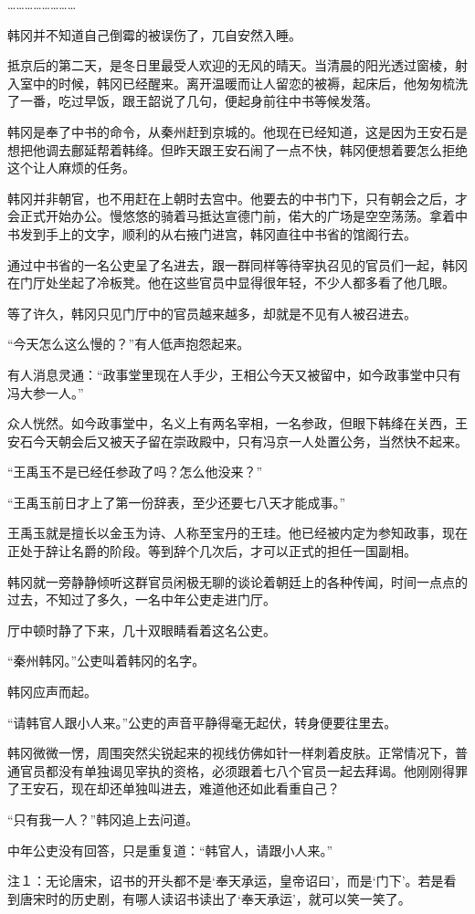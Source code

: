 ……………………

韩冈并不知道自己倒霉的被误伤了，兀自安然入睡。

抵京后的第二天，是冬日里最受人欢迎的无风的晴天。当清晨的阳光透过窗棱，射入室中的时候，韩冈已经醒来。离开温暖而让人留恋的被褥，起床后，他匆匆梳洗了一番，吃过早饭，跟王韶说了几句，便起身前往中书等候发落。

韩冈是奉了中书的命令，从秦州赶到京城的。他现在已经知道，这是因为王安石是想把他调去鄜延帮着韩绛。但昨天跟王安石闹了一点不快，韩冈便想着要怎么拒绝这个让人麻烦的任务。

韩冈并非朝官，也不用赶在上朝时去宫中。他要去的中书门下，只有朝会之后，才会正式开始办公。慢悠悠的骑着马抵达宣德门前，偌大的广场是空空荡荡。拿着中书发到手上的文字，顺利的从右掖门进宫，韩冈直往中书省的馆阁行去。

通过中书省的一名公吏呈了名进去，跟一群同样等待宰执召见的官员们一起，韩冈在门厅处坐起了冷板凳。他在这些官员中显得很年轻，不少人都多看了他几眼。

等了许久，韩冈只见门厅中的官员越来越多，却就是不见有人被召进去。

“今天怎么这么慢的？”有人低声抱怨起来。

有人消息灵通：“政事堂里现在人手少，王相公今天又被留中，如今政事堂中只有冯大参一人。”

众人恍然。如今政事堂中，名义上有两名宰相，一名参政，但眼下韩绛在关西，王安石今天朝会后又被天子留在崇政殿中，只有冯京一人处置公务，当然快不起来。

“王禹玉不是已经任参政了吗？怎么他没来？”

“王禹玉前日才上了第一份辞表，至少还要七八天才能成事。”

王禹玉就是擅长以金玉为诗、人称至宝丹的王珪。他已经被内定为参知政事，现在正处于辞让名爵的阶段。等到辞个几次后，才可以正式的担任一国副相。

韩冈就一旁静静倾听这群官员闲极无聊的谈论着朝廷上的各种传闻，时间一点点的过去，不知过了多久，一名中年公吏走进门厅。

厅中顿时静了下来，几十双眼睛看着这名公吏。

“秦州韩冈。”公吏叫着韩冈的名字。

韩冈应声而起。

“请韩官人跟小人来。”公吏的声音平静得毫无起伏，转身便要往里去。

韩冈微微一愣，周围突然尖锐起来的视线仿佛如针一样刺着皮肤。正常情况下，普通官员都没有单独谒见宰执的资格，必须跟着七八个官员一起去拜谒。他刚刚得罪了王安石，现在却还单独叫进去，难道他还如此看重自己？

“只有我一人？”韩冈追上去问道。

中年公吏没有回答，只是重复道：“韩官人，请跟小人来。”

注１：无论唐宋，诏书的开头都不是‘奉天承运，皇帝诏曰’，而是‘门下’。若是看到唐宋时的历史剧，有哪人读诏书读出了‘奉天承运’，就可以笑一笑了。

